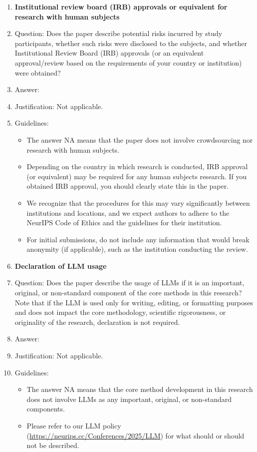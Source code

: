 \documentclass{article}
\theoremstyle{plain}
\theoremstyle{definition}
\theoremstyle{remark}
\begin{document}
\begin{enumerate}
\item {\bf Institutional review board (IRB) approvals or equivalent for research with human subjects}
    \item[] Question: Does the paper describe potential risks incurred by study participants, whether such risks were disclosed to the subjects, and whether Institutional Review Board (IRB) approvals (or an equivalent approval/review based on the requirements of your country or institution) were obtained?
    \item[] Answer: \answerNA{} %
    \item[] Justification: Not applicable.
    \item[] Guidelines:
    \begin{itemize}
        \item The answer NA means that the paper does not involve crowdsourcing nor research with human subjects.
        \item Depending on the country in which research is conducted, IRB approval (or equivalent) may be required for any human subjects research. If you obtained IRB approval, you should clearly state this in the paper. 
        \item We recognize that the procedures for this may vary significantly between institutions and locations, and we expect authors to adhere to the NeurIPS Code of Ethics and the guidelines for their institution. 
        \item For initial submissions, do not include any information that would break anonymity (if applicable), such as the institution conducting the review.
    \end{itemize}

\item {\bf Declaration of LLM usage}
    \item[] Question: Does the paper describe the usage of LLMs if it is an important, original, or non-standard component of the core methods in this research? Note that if the LLM is used only for writing, editing, or formatting purposes and does not impact the core methodology, scientific rigorousness, or originality of the research, declaration is not required.
    \item[] Answer: \answerNA{} %
    \item[] Justification: Not applicable.
    \item[] Guidelines:
    \begin{itemize}
        \item The answer NA means that the core method development in this research does not involve LLMs as any important, original, or non-standard components.
        \item Please refer to our LLM policy (\url{https://neurips.cc/Conferences/2025/LLM}) for what should or should not be described.
    \end{itemize}
\end{enumerate}
\end{document}
